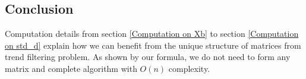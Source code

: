 \subsection{Conclusion}

Computation details from section \ref{Computation on Xb} to section \ref{Computation on std_d} explain how we can benefit from the unique structure of matrices from trend filtering problem. As shown by our formula, we do not need to form any matrix and complete \susie algorithm with $O(n)$ complexity. 
















